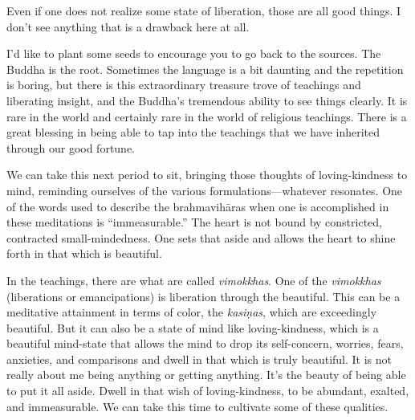 Even if one does not realize some state of liberation, those are all
good things. I don’t see anything that is a drawback here at all.

I’d like to plant some seeds to encourage you to go back to the sources.
The Buddha is the root. Sometimes the language is a bit daunting and the
repetition is boring, but there is this extraordinary treasure trove of
teachings and liberating insight, and the Buddha’s tremendous ability to
see things clearly. It is rare in the world and certainly rare in the
world of religious teachings. There is a great blessing in being able to
tap into the teachings that we have inherited through our good fortune.

We can take this next period to sit, bringing those thoughts of
loving-kindness to mind, reminding ourselves of the various
formulations—whatever resonates. One of the words used to describe the
brahmavihāras when one is accomplished in these meditations is
“immeasurable.” The heart is not bound by constricted, contracted
small-mindedness. One sets that aside and allows the heart to shine
forth in that which is beautiful.

In the teachings, there are what are called \emph{vimokkhas}. One of the
\emph{vimokkhas} (liberations or emancipations) is liberation through
the beautiful. This can be a meditative attainment in terms of color,
the \emph{kasiṇas}, which are exceedingly beautiful. But it can also be
a state of mind like loving-kindness, which is a beautiful mind-state
that allows the mind to drop its self-concern, worries, fears,
anxieties, and comparisons and dwell in that which is truly beautiful.
It is not really about me being anything or getting anything. It’s the
beauty of being able to put it all aside. Dwell in that wish of
loving-kindness, to be abundant, exalted, and immeasurable. We can take
this time to cultivate some of these qualities.
